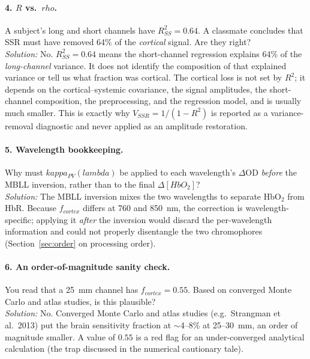 \documentclass[12pt]{article}
\def\kappa{kappa}%
\def\rho{rho}%
\def\lambda{lambda}%
\def\text#1{#1}%
\begin{document}
\paragraph{4. $R$ vs.\ $\rho$.} A subject's long and short channels have $R^2_{\text{SS}}=0.64$. A classmate concludes that SSR must have removed 64\% of the \emph{cortical} signal. Are they right?\\
\textit{Solution:} No. $R^2_{\text{SS}}=0.64$ means the short-channel regression explains 64\% of the \emph{long-channel} variance. It does not identify the composition of that explained variance or tell us what fraction was cortical. The cortical loss is not set by $R^2$; it depends on the cortical--systemic covariance, the signal amplitudes, the short-channel composition, the preprocessing, and the regression model, and is usually much smaller. This is exactly why $V_{\text{SSR}}=1/(1-R^2)$ is reported as a variance-removal diagnostic and never applied as an amplitude restoration.

\paragraph{5. Wavelength bookkeeping.} Why must $\kappa_{\text{PV}}(\lambda)$ be applied to each wavelength's $\Delta$OD \emph{before} the MBLL inversion, rather than to the final $\Delta[\text{HbO}_2]$?\\
\textit{Solution:} The MBLL inversion mixes the two wavelengths to separate HbO$_2$ from HbR. Because $f_{\text{cortex}}$ differs at 760 and 850~nm, the correction is wavelength-specific; applying it \emph{after} the inversion would discard the per-wavelength information and could not properly disentangle the two chromophores (Section~\ref{sec:order} on processing order).

\paragraph{6. An order-of-magnitude sanity check.} You read that a 25~mm channel has $f_{\text{cortex}}=0.55$. Based on converged Monte Carlo and atlas studies, is this plausible?\\
\textit{Solution:} No. Converged Monte Carlo and atlas studies (e.g.\ Strangman et al.\ 2013) put the brain sensitivity fraction at $\sim$4--8\% at 25--30~mm, an order of magnitude smaller. A value of $0.55$ is a red flag for an under-converged analytical calculation (the trap discussed in the numerical cautionary tale).
\end{document}
